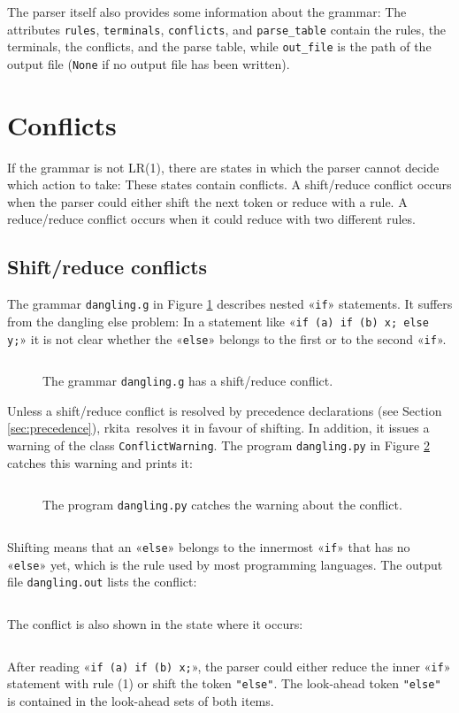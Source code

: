 \documentclass[11pt,a4paper]{article}
\makeatletter
\newcommand{\blue}[1]{{\color{blue}#1}}
\newcommand{\fakesc}[1]{\resizebox{!}{0.99ex}{\textls[90]{\MakeUppercase{#1}}}}
\def\@simtextsc#1#2\@nil{\MakeUppercase{#1}\fakesc{#2}}
\newcommand{\simtextsc}[1]{%
  \ifmmode\text{\@simtextsc#1\@nil}\else\@simtextsc#1\@nil\fi}
\newcommand{\Larkita}{\simtextsc{Larkita}}
\newenvironment{unbreakable}{\par\noindent\begin{minipage}{\linewidth}}{\end{minipage}\par}
\newcommand{\codefigure}[5][]{\begin{figure}[H]%
  \inputminted[numbers = left, numbersep = 0.3cm, #1]{#2}{examples/#3}%
  \vspace*{-0.3cm}%
  \caption{#5}\label{#4}\end{figure}}
\newcommand{\grammarfile}[2]{\codefigure{larkita_lexer.py:LarkitaLexer}{#1}{fig:#1}{#2}}
\newcommand{\pythonfile}[2]{\codefigure{python3}{#1}{fig:#1}{#2}}
\newcommand{\resultfile}[2][\normalsize]{\begin{unbreakable}%
  \inputminted[fontsize = #1, breaklines]{text}{examples/output/#2.txt}\end{unbreakable}}
\makeatother
\begin{document}
The parser itself also provides some information about the grammar:  The attributes \texttt{rules},
\texttt{terminals}, \texttt{conflicts}, and \texttt{parse\_table} contain the rules, the terminals, the
conflicts, and the parse table, while \texttt{out\_file} is the path of the output file (\texttt{None} if
no output file has been written).

\section{Conflicts}
If the grammar is not LR(1), there are states in which the parser cannot decide which action to take:
These states contain \blue{conflicts}.  A \blue{shift/reduce conflict} occurs when the parser could either
shift the next token or reduce with a rule.  A \blue{reduce/reduce conflict} occurs when it could reduce with
two different rules.

\subsection{Shift/reduce conflicts}
The grammar \texttt{dangling.g} in Figure \ref{fig:dangling.g} describes nested «\verb|if|» statements.  It
suffers from the \blue{dangling else problem}:  In a statement like «\verb|if (a) if (b) x; else y;|» it is not
clear whether the «\verb|else|» belongs to the first or to the second «\verb|if|».
\grammarfile{dangling.g}{The grammar \texttt{dangling.g} has a shift/reduce conflict.}
Unless a shift/reduce conflict is resolved by precedence declarations (see Section \ref{sec:precedence}),
\Larkita\ resolves it in favour of shifting.  In addition, it issues a warning of the class
\texttt{ConflictWarning}.  The program \texttt{dangling.py} in Figure \ref{fig:dangling.py} catches
this warning and prints it:
\pythonfile{dangling.py}{The program \texttt{dangling.py} catches the warning about the conflict.}
\resultfile[\small]{dangling}
Shifting means that an «\verb|else|» belongs to the innermost «\verb|if|» that has no «\verb|else|» yet, which is
the rule used by most programming languages.  The output file \texttt{dangling.out} lists the conflict:
\resultfile[\small]{dangling-conflicts}
The conflict is also shown in the state where it occurs:
\resultfile[\small]{dangling-state}
After reading «\verb|if (a) if (b) x;|», the parser could either reduce the inner «\verb|if|» statement with rule
(1) or shift the token \verb|"else"|.  The look-ahead token \verb|"else"| is contained in the look-ahead sets of
both items.
\end{document}
